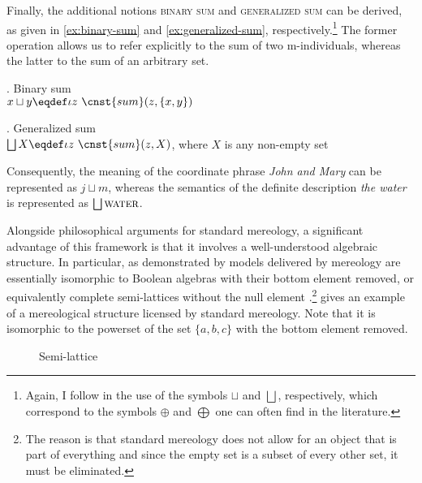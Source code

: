 Finally, the additional notions \textsc{binary sum} and \textsc{generalized sum} can be derived, as given in \ref{ex:binary-sum} and \ref{ex:generalized-sum}, respectively.\footnote{Again, I follow \citet{landman1989groupsi,landman1989groupsii,landman2000events} in the use of the symbols $\sqcup$ and $\bigsqcup$, respectively, which correspond to the symbols $\oplus$ and $\bigoplus$ one can often find in the literature.} The former operation allows us to refer explicitly to the sum of two m-individuals, whereas the latter to the sum of an arbitrary set.

\ex. Binary sum \citep[p. 518; adapted]{champollion_krifka2016mereology}\label{ex:binary-sum}\\
$x \sqcup y \eqdef \iota z\ \cnst{sum}(z,\{x,y\})$

\ex. Generalized sum \citep[p. 518; adapted]{champollion_krifka2016mereology}\label{ex:generalized-sum}\\
$\bigsqcup X \eqdef \iota z\ \cnst{sum}(z,X)$, where $X$ is any non-empty set

Consequently, the meaning of the coordinate phrase \textit{John and Mary} can be represented as $j \sqcup m$, whereas the semantics of the definite description \textit{the water} is represented as $\bigsqcup\textsc{water}$.

Alongside philosophical arguments for standard mereology, a significant advantage of this framework is that it involves a well-understood algebraic structure. In particular, as demonstrated by \citet{tarski1935grundlegung} models delivered by mereology are essentially isomorphic to Boolean algebras with their bottom element removed, or equivalently complete semi-lattices without the null element \citep[see also][]{pontow_schubert2006mathematical}.\footnote{The reason is that standard mereology does not allow for an object that is part of everything and since the empty set is a subset of every other set, it must be eliminated.}  gives an example of a mereological structure licensed by standard mereology. Note that it is isomorphic to the powerset of the set $\{a,b,c\}$ with the bottom element removed. 

\begin{figure}[h!]
\centering
{}
\caption{Semi-lattice}
\label{fig:semi-lattice}
\end{figure}

